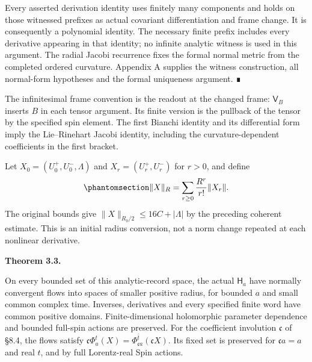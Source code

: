 \documentclass[
  english,
  11pt,
  reqno]{amsart}
\makeatletter
\newcommand{\pandocstatementheading}[1]{%
  \par\addpenalty{\@beginparpenalty}%
  \addvspace{.5\baselineskip plus .2\baselineskip minus .2\baselineskip}%
  {\normalfont\bfseries #1\par}%
  \nobreak\@afterindenttrue\@afterheading
}
\makeatother
\begin{document}
Every asserted derivation identity uses finitely many components and
holds on those witnessed prefixes as actual covariant differentiation
and frame change. It is consequently a polynomial identity. The
necessary finite prefix includes every derivative appearing in that
identity; no infinite analytic witness is used in this argument. The
radial Jacobi recurrence fixes the formal normal metric from the
completed ordered curvature. Appendix A supplies the witness
construction, all normal-form hypotheses and the formal uniqueness
argument. ∎

The infinitesimal frame convention is the readout at the changed frame:
\(\mathsf V_B\) inserts \(B\) in each tensor argument. Its finite
version is the pullback of the tensor by the specified spin element. The
first Bianchi identity and its differential form imply the Lie--Rinehart
Jacobi identity, including the curvature-dependent coefficients in the
first bracket.

Let \(X_0=(U_0^+,U_0^-,\Lambda)\) and \(X_r=(U_r^+,U_r^-)\) for \(r>0\),
and define
\begin{equation}\protect\phantomsection\label{eq:gg-record-banach-norm}{
 \|X\|_R=\sum_{r\ge0}\frac{R^r}{r!}\|X_r\|.
}\end{equation} The original bounds give
\(\|X\|_{R_0/2}\le16C+|\Lambda|\) by the preceding coherent estimate.
This is an initial radius conversion, not a norm change repeated at each
nonlinear derivative.

\pandocstatementheading{\protect{}\label{thm:gg-record-flows}Theorem 3.3.}

On every bounded set of this analytic-record space, the actual
\(\mathsf H_a\) have normally convergent flows into spaces of smaller
positive radius, for bounded \(a\) and small common complex time.
Inverses, derivatives and every specified finite word have common
positive domains. Finite-dimensional holomorphic parameter dependence
and bounded full-spin actions are preserved. For the coefficient
involution \(\mathfrak c\) of §8.4, the flows satisfy
\(\mathfrak c\Phi_a^t(X)=\Phi_{\mathfrak ca}^{\bar t}(\mathfrak cX)\).
Its fixed set is preserved for \(\mathfrak ca=a\) and real \(t\), and by
full Lorentz-real Spin actions.
\end{document}
